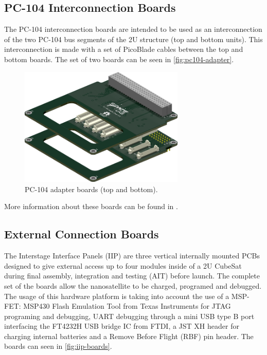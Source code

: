 \subsection{PC-104 Interconnection Boards}

The PC-104 interconnection boards are intended to be used as an interconnection of the two PC-104 bus segments of the 2U structure (top and bottom units). This interconnection is made with a set of PicoBlade cables between the top and bottom boards. The set of two boards can be seen in \autoref{fig:pc104-adapter}.

\begin{figure}[!ht]
    \begin{center}
        \includegraphics[width=0.7\textwidth]{figures/pc104-adapter}
        \caption{PC-104 adapter boards (top and bottom).}
        \label{fig:pc104-adapter}
    \end{center}
\end{figure}

More information about these boards can be found in \cite{pc104-boards}.

\subsection{External Connection Boards}

The Interstage Interface Panels (IIP) are three vertical internally mounted PCBs designed to give external access up to four modules inside of a 2U CubeSat during final assembly, integration and testing (AIT) before launch. The complete set of the boards allow the nanosatellite to be charged, programed and debugged. The usage of this hardware platform is taking into account the use of a MSP-FET: MSP430 Flash Emulation Tool from Texas Instruments for JTAG programing and debugging, UART debugging through a mini USB type B port interfacing the FT4232H USB bridge IC from FTDI, a JST XH header for charging internal batteries and a Remove Before Flight (RBF) pin header. The boards can seen in \autoref{fig:iip-boards}.

